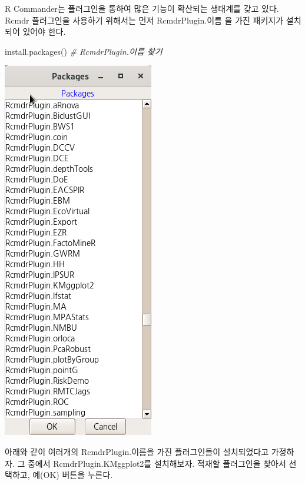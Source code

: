 \documentclass[
]{book}
\newenvironment{Shaded}{\begin{snugshade}}{\end{snugshade}}
\newcommand{\CommentTok}[1]{\textcolor[rgb]{0.56,0.35,0.01}{\textit{#1}}}
\newcommand{\FunctionTok}[1]{\textcolor[rgb]{0.00,0.00,0.00}{#1}}
\newcommand{\NormalTok}[1]{#1}
\begin{document}
R Commander는 플러그인을 통하여 많은 기능이 확산되는 생태계를 갖고 있다. Rcmdr 플러그인을 사용하기 위해서는 먼저 RcmdrPlugin.이름 을 가진 패키지가 설치되어 있어야 한다.

\begin{Shaded}
\begin{Highlighting}[]
\FunctionTok{install.packages}\NormalTok{()  }\CommentTok{\# RcmdrPlugin.이름 찾기}
\end{Highlighting}
\end{Shaded}

\includegraphics{fig/tools-load-plugin-02.png}

아래와 같이 여러개의 RcmdrPlugin.이름을 가진 플러그인들이 설치되었다고 가정하자. 그 중에서 RcmdrPlugin.KMggplot2를 설치해보자. 적재할 플러그인을 찾아서 선택하고, 예(OK) 버튼을 누른다.
\end{document}
